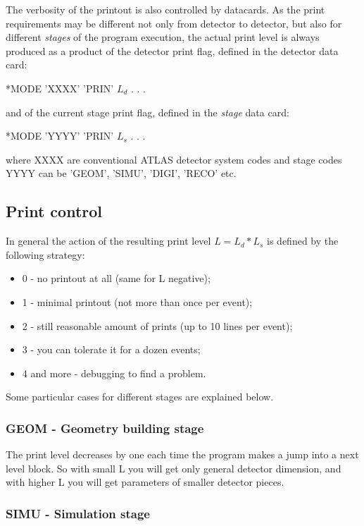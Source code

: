 The verbosity of the printout is also controlled by datacards.
As the print requirements may be different 
not only from detector to detector, 
but also for different  {\it stages} of the program execution,
the actual print level is always produced as a product 
of the detector print flag, 
defined in the { detector } data card:
\begin{center} *MODE 'XXXX' 'PRIN' $L_d$ . . . \end{center}
and of the current stage print flag,
defined in the {\it stage} data card:
\begin{center} *MODE 'YYYY' 'PRIN' $L_s$ . . . \end{center}
where XXXX are conventional ATLAS detector system codes and 
stage codes YYYY can be 'GEOM', 'SIMU', 'DIGI', 'RECO' etc.

\subsection{Print control}

In general the action of the resulting print level $L=L_d*L_s$ 
is defined by the following strategy:
\begin{itemize}
\item  0 - no printout at all (same for L negative);
\item  1 - minimal printout (not more than once per event);
\item  2 - still reasonable amount of prints (up to 10 lines per event);
\item  3 - you can tolerate it for a dozen events;
\item  4 and more - debugging to find a problem. 
\end{itemize} 
Some particular cases for different stages are explained below.

\subsubsection{GEOM - Geometry building stage}

The print level decreases by one each time the program 
makes a jump into a next level block.  
So with small L you will get only general detector dimension, 
and with higher L you will get parameters of smaller detector pieces.
 
\subsubsection{SIMU - Simulation stage} 

